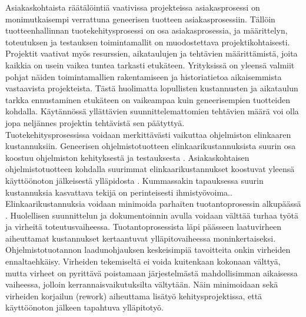 \documentclass[finnish,12pt,a4paper,pdftex]{article}
\begin{document}
Asiakaskohtaista räätälöintiä vaativissa projekteissa asiakasprosessi on monimutkaisempi verrattuna geneerisen tuotteen asiakasprosessiin. Tällöin tuotteenhallinnan tuotekehitysprosessi on osa asiakasprosessia, ja määrittelyn, toteutuksen ja testauksen toimintamallit on muodostettava projektikohtaisesti. Projektit vaativat myös resurssien, aikataulujen ja tehtävien määrittämistä, joita kaikkia on usein vaikea tuntea tarkasti etukäteen. Yrityksissä on yleensä valmiit pohjat näiden toimintamallien rakentamiseen ja historiatietoa aikaisemmista vastaavista projekteista. Tästä huolimatta lopullisten kustannusten ja aikataulun tarkka ennustaminen etukäteen on vaikeampaa kuin geneerisempien tuotteiden kohdalla. Käytännössä yllättävien suunnittelemattomien tehtävien määrä voi olla jopa neljännes projektin tehtävistä sen päätyttyä. \citep{ohjelmistotuotanto}\\

Tuotekehitysprosessissa voidaan merkittävästi vaikuttaa ohjelmiston elinkaaren kustannuksiin. Geneerisen ohjelmistotuotteen elinkaarikustannuksista suurin osa koostuu ohjelmiston kehityksestä ja testauksesta \citep{sommerville}. Asiakaskohtaisen ohjelmistotuotteen kohdalla suurimmat elinkaarikustannukset koostuvat yleensä käyttöönoton jälkeisestä ylläpidosta \citep{sommerville, ohjelmistotuotanto}. Kummassakin tapauksessa suurin kustannuksia kasvattava tekijä on perinteisesti ihmistyövoima.\citep{ohjelmistotuotanto}. \\

Elinkaarikustannuksia voidaan minimoida parhaiten tuotantoprosessin alkupäässä \citep{ohjelmistotuotanto}. Huolellisen suunnittelun ja dokumentoinnin avulla voidaan välttää turhaa työtä ja virheitä toteutusvaiheessa. Tuotantoprosessista läpi päässeen laatuvirheen aiheuttamat kustannukset kertaantuvat ylläpitovaiheessa moninkertaiseksi. Ohjelmistotuotannon laadunohjauksen keskeisimpiä tavoitteita onkin virheiden ennaltaehkäisy. Virheiden tekemiseltä ei voida kuitenkaan kokonaan välttyä, mutta virheet on pyrittävä poistamaan järjestelmästä mahdollisimman aikaisessa vaiheessa, jolloin kerrannaisvaikutuksilta vältytään. Näin minimoidaan sekä virheiden korjailun (rework) aiheuttama lisätyö kehitysprojektissa, että käyttöönoton jälkeen tapahtuva ylläpitotyö. \citep{okaytannot}

\end{document}
